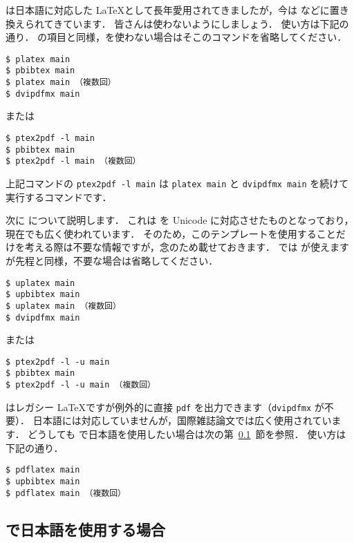 \pLaTeX は日本語に対応した \LaTeX として長年愛用されてきましたが，今は \LuaLaTeX などに置き換えられてきています．
皆さんは使わないようにしましょう．
使い方は下記の通り．
\LuaLaTeX の項目と同様，\BibTeX を使わない場合はそこのコマンドを省略してください．

\begin{tcolorbox}[title={\pLaTeX$+$\pBibTeX}]
\begin{verbatim}
$ platex main
$ pbibtex main
$ platex main （複数回）
$ dvipdfmx main
\end{verbatim}
または
\begin{verbatim}
$ ptex2pdf -l main
$ pbibtex main
$ ptex2pdf -l main （複数回）
\end{verbatim}
\end{tcolorbox}

上記コマンドの \verb|ptex2pdf -l main| は \verb|platex main| と \verb|dvipdfmx main| を続けて実行するコマンドです．

次に \upLaTeX について説明します．
これは \pLaTeX を Unicode に対応させたものとなっており，現在でも広く使われています．
そのため，このテンプレートを使用することだけを考える際は不要な情報ですが，念のため載せておきます．
\upLaTeX では \upBibTeX が使えますが先程と同様，不要な場合は省略してください．

\begin{tcolorbox}[title={\upLaTeX$+$\upBibTeX}]
\begin{verbatim}
$ uplatex main
$ upbibtex main
$ uplatex main （複数回）
$ dvipdfmx main
\end{verbatim}
または
\begin{verbatim}
$ ptex2pdf -l -u main
$ pbibtex main
$ ptex2pdf -l -u main （複数回）
\end{verbatim}
\end{tcolorbox}

\pLaTeX はレガシー \LaTeX ですが例外的に直接 \verb|pdf| を出力できます（\verb|dvipdfmx| が不要）．
日本語には対応していませんが，国際雑誌論文では広く使用されています．
どうしても \pdfLaTeX で日本語を使用したい場合は次の第~\ref{ssec:pdflatex_jp}~節を参照．
使い方は下記の通り．

\begin{tcolorbox}[title={\pdfLaTeX$+$\upBibTeX}]
\begin{verbatim}
$ pdflatex main
$ upbibtex main
$ pdflatex main （複数回）
\end{verbatim}
\end{tcolorbox}


\subsection{\pdfLaTeX で日本語を使用する場合}
\label{ssec:pdflatex_jp}

